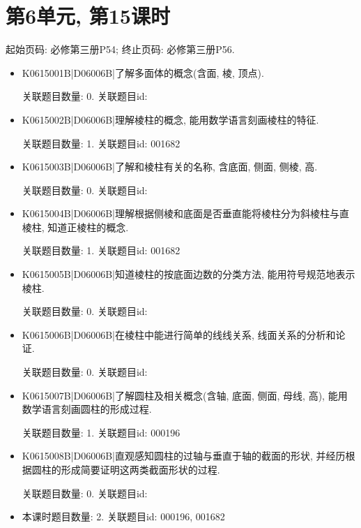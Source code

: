 \section*{第6单元, 第15课时}
起始页码: 必修第三册P54; 终止页码: 必修第三册P56.
\begin{itemize}
\item K0615001B|D06006B|了解多面体的概念(含面, 棱, 顶点).

关联题目数量: 0. 关联题目id: 

\item K0615002B|D06006B|理解棱柱的概念, 能用数学语言刻画棱柱的特征.

关联题目数量: 1. 关联题目id: 001682

\item K0615003B|D06006B|了解和棱柱有关的名称, 含底面, 侧面, 侧棱, 高.

关联题目数量: 0. 关联题目id: 

\item K0615004B|D06006B|理解根据侧棱和底面是否垂直能将棱柱分为斜棱柱与直棱柱, 知道正棱柱的概念.

关联题目数量: 1. 关联题目id: 001682

\item K0615005B|D06006B|知道棱柱的按底面边数的分类方法, 能用符号规范地表示棱柱.

关联题目数量: 0. 关联题目id: 

\item K0615006B|D06006B|在棱柱中能进行简单的线线关系, 线面关系的分析和论证.

关联题目数量: 0. 关联题目id: 

\item K0615007B|D06006B|了解圆柱及相关概念(含轴, 底面, 侧面, 母线, 高), 能用数学语言刻画圆柱的形成过程.

关联题目数量: 1. 关联题目id: 000196

\item K0615008B|D06006B|直观感知圆柱的过轴与垂直于轴的截面的形状, 并经历根据圆柱的形成简要证明这两类截面形状的过程.

关联题目数量: 0. 关联题目id: 

\item 本课时题目数量: 2. 关联题目id: 000196, 001682

\end{itemize}

